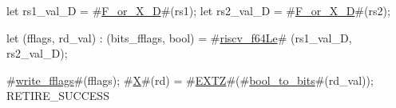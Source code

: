 let rs1_val_D = #\hyperref[sailRISCVzFzyorzyXzyD]{F\_or\_X\_D}#(rs1);
let rs2_val_D = #\hyperref[sailRISCVzFzyorzyXzyD]{F\_or\_X\_D}#(rs2);

let (fflags, rd_val) : (bits_fflags, bool) =
    #\hyperref[sailRISCVzriscvzyf64Le]{riscv\_f64Le}# (rs1_val_D, rs2_val_D);

#\hyperref[sailRISCVzwritezyfflags]{write\_fflags}#(fflags);
#\hyperref[sailRISCVzX]{X}#(rd) = #\hyperref[sailRISCVzEXTZ]{EXTZ}#(#\hyperref[sailRISCVzboolzytozybits]{bool\_to\_bits}#(rd_val));
RETIRE_SUCCESS
